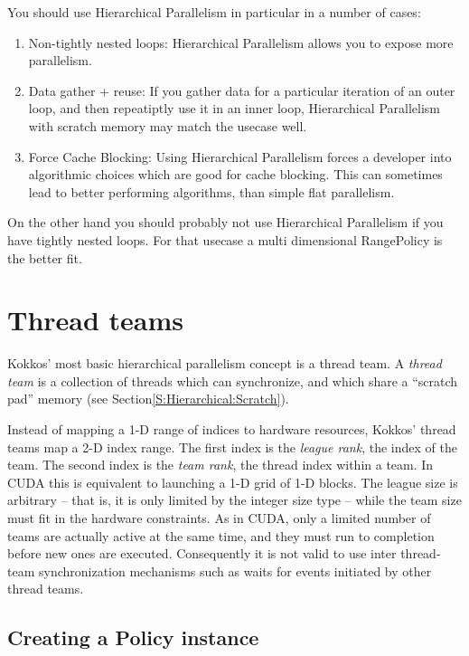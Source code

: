 You should use Hierarchical Parallelism in particular in a number of cases:
\begin{enumerate}
\item Non-tightly nested loops: Hierarchical Parallelism allows you to expose more parallelism.
\item Data gather + reuse: If you gather data for a particular iteration of an outer loop, and then repeatiptly use it in an inner loop, Hierarchical Parallelism with scratch memory may match the usecase well.
\item Force Cache Blocking: Using Hierarchical Parallelism forces a developer into algorithmic choices which are good for cache blocking. This can sometimes lead to better performing algorithms, than simple flat parallelism.
\end{enumerate}

On the other hand you should probably not use Hierarchical Parallelism if you have tightly nested loops. 
For that usecase a multi dimensional RangePolicy is the better fit. 

\section{Thread teams}\label{S:Hierarchical:Teams}

Kokkos' most basic hierarchical parallelism concept is a thread team.
A \emph{thread team} is a collection of threads which can synchronize,
and which share a ``scratch pad'' memory
(see Section\ref {S:Hierarchical:Scratch}).

Instead of mapping a 1-D range of indices to hardware resources,
Kokkos' thread teams map a 2-D index range.
The first index is the \emph{league rank}, the index of the team.
The second index is the \emph{team rank}, the thread index within a team.
In CUDA this is equivalent to launching a 1-D grid of 1-D blocks.
The league size is arbitrary -- that is, it is only limited by the integer size type -- while the team size must fit in the hardware constraints.
As in CUDA, only a limited number of teams are actually active at the same time,
and they must run to completion before new ones are executed. 
Consequently it is not valid to use inter thread-team synchronization mechanisms
such as waits for events initiated by other thread teams. 

\subsection{Creating a Policy instance}\label{SS:Hierarchical:Teams:Policy}

